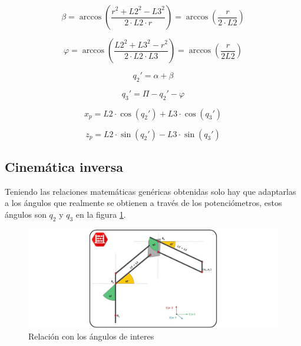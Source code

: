     \begin{equation}
        \beta = \arccos\left(\frac{r^2+L2^2-L3^2}{2 \cdot L2 \cdot r}\right) = \arccos\left(\frac{r}{2 \cdot L2}\right)
    \end{equation}

    \begin{equation}
        \varphi = \arccos\left(\frac{L2^2+L3^2-r^2}{2 \cdot L2 \cdot L3}\right) = \arccos\left(\frac{r}{2L2}\right)
    \end{equation}

    \begin{equation}
        q_2' = \alpha + \beta
    \end{equation}

    \begin{equation}
        q_3' = \varPi - q_2' - \varphi
    \end{equation}

    \begin{equation}
        x_p = L2\cdot \cos(q_2') + L3\cdot \cos(q_3')
    \end{equation}

    \begin{equation}
        z_p = L2\cdot \sin(q_2') - L3\cdot \sin(q_3')
    \end{equation}

\subsection{Cinemática inversa}

    Teniendo las relaciones matemáticas genéricas obtenidas solo hay que adaptarlas a los ángulos que realmente se obtienen a través de los potenciómetros, estos ángulos son $q_2$ y $q_3$ en la figura \ref{fig:Control:cinematica_3}.

    \begin{figure}[H]
        \centering
        \includegraphics[width=1\textwidth]{figuras/Imagenes_cinematica/cinematica_3.jpg}
        \caption{Relación con los ángulos de interes}
        \label{fig:Control:cinematica_3}
    \end{figure}

